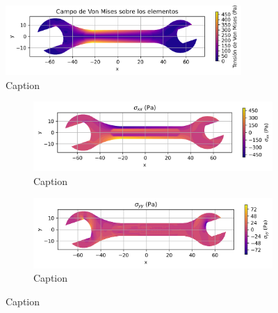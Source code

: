 \documentclass{article}  %
\begin{document}
\begin{figure}[H]
  \centering
  \includegraphics[width=0.8\textwidth]{GRAFICOS/Case a_von_mises.png}
  \caption{Caption}
  \label{fig:principal}
\end{figure}

\begin{figure}[H]
  \centering
  \begin{subfigure}[t]{0.49\textwidth}
    \centering
    \includegraphics[width=\textwidth]{GRAFICOS/Case a - sigma_xx.png}
    \caption{Caption}
    \label{fig:deformada_reacciones}
  \end{subfigure}
  \hfill
  \begin{subfigure}[t]{0.49\textwidth}
    \centering
    \includegraphics[width=\textwidth]{GRAFICOS/Case a - sigma_yy.png}
    \caption{Caption}
    \label{fig:von_mises}
  \end{subfigure}
  \caption{Caption}
  \label{fig:analisis_estructural}
\end{figure}
\end{document}
